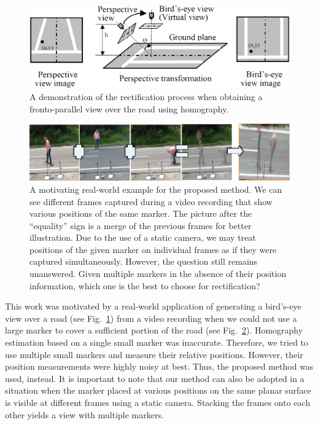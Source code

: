\begin{figure}[t]
    \centerline{\includegraphics[width=0.7\linewidth]{figures/methodology/road_rectification.png}}
    \caption[Road rectification]{A demonstration of the rectification process when obtaining a fronto-parallel view over the road using homography. }
    \label{fig:RoadRectification}
\end{figure}

\begin{figure}[t]
    \centerline{\includegraphics[width=\linewidth]{figures/methodology/markers_on_the_road.png}}
    \caption[Multiple markers on the road]{A motivating real-world example for the proposed method. We can see different frames captured during a video recording that show various positions of the same marker. The picture after the ``equality'' sign is a merge of the previous frames for better illustration. Due to the use of a static camera, we may treat positions of the given marker on individual frames as if they were captured simultaneously. However, the question still remains unanswered. Given multiple markers in the absence of their position information, which one is the best to choose for rectification?}
    \label{fig:MultipleMarkersOnRoad}
\end{figure}

This work was motivated by a real-world application of generating a bird's-eye view over a road (see Fig.~\ref{fig:RoadRectification}) from a video recording when we could not use a large marker to cover a sufficient portion of the road (see Fig.~\ref{fig:MultipleMarkersOnRoad}). Homography estimation based on a single small marker was inaccurate. Therefore, we tried to use multiple small markers and measure their relative positions. However, their position measurements were highly noisy at best. Thus, the proposed method was used, instead. It is important to note that our method can also be adopted in a situation when the marker placed at various positions on the same planar surface is visible at different frames using a static camera. Stacking the frames onto each other yields a view with multiple markers.

